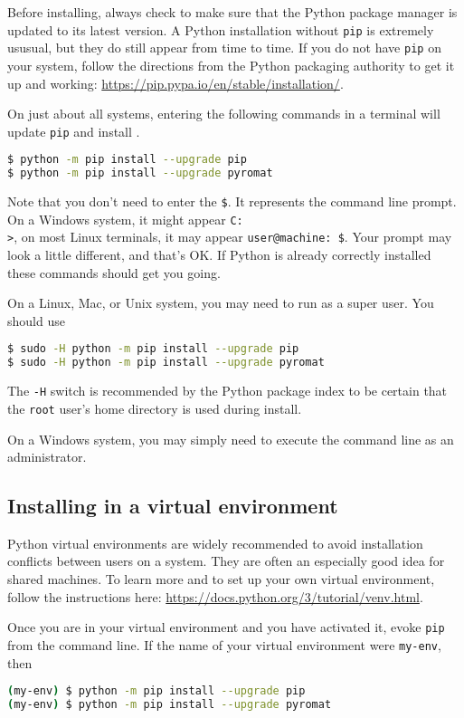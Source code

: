 Before installing, always check to make sure that the Python package manager is updated to its latest version.  A Python installation without \texttt{pip} is extremely ususual, but they do still appear from time to time.  If you do not have \texttt{pip} on your system, follow the directions from the Python packaging authority to get it up and working: \url{https://pip.pypa.io/en/stable/installation/}.

On just about all systems, entering the following commands in a terminal will update \texttt{pip} and install \PM.
\begin{lstlisting}[language=bash]
$ python -m pip install --upgrade pip
$ python -m pip install --upgrade pyromat
\end{lstlisting}
Note that you don't need to enter the \texttt{\$}.  It represents the command line prompt. On a Windows system, it might appear \texttt{C:\\>}, on most Linux terminals, it may appear \texttt{user@machine:~\$}.  Your prompt may look a little different, and that's OK.  If Python is already correctly installed these commands should get you going.

On a Linux, Mac, or Unix system, you may need to run as a super user.  You should use
\begin{lstlisting}[language=bash]
$ sudo -H python -m pip install --upgrade pip
$ sudo -H python -m pip install --upgrade pyromat
\end{lstlisting}
The \texttt{-H} switch is recommended by the Python package index to be certain that the \texttt{root} user's home directory is used during install.

On a Windows system, you may simply need to execute the command line as an administrator.  

\subsection{Installing in a virtual environment}

Python virtual environments are widely recommended to avoid installation conflicts between users on a system.  They are often an especially good idea for shared machines.  To learn more and to set up your own virtual environment, follow the instructions here: \url{https://docs.python.org/3/tutorial/venv.html}.  

Once you are in your virtual environment and you have activated it, evoke \texttt{pip} from the command line.  If the name of your virtual environment were \texttt{my-env}, then
\begin{lstlisting}[language=bash]
(my-env) $ python -m pip install --upgrade pip
(my-env) $ python -m pip install --upgrade pyromat
\end{lstlisting}

